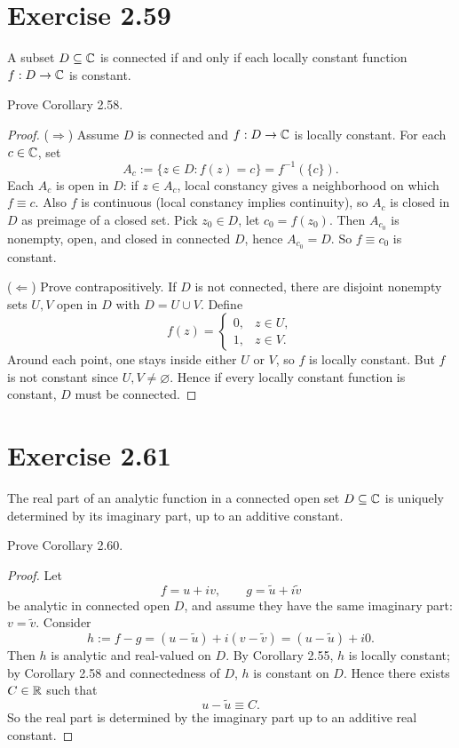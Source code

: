 \documentclass{article}
\begin{document}
\section{Exercise 2.59}

\begin{corollary}[Corollary 2.58]
  A subset $D \subseteq \mathbb{C}$ is connected if and only if each locally
  constant function $f : D \to \mathbb{C}$ is constant.
\end{corollary}

Prove Corollary 2.58.

\begin{proof}
  ($\Rightarrow$) Assume $D$ is connected and $f:D\to\mathbb{C}$ is locally
  constant. For each $c\in\mathbb{C}$, set
  \[
    A_c:=\{z\in D: f(z)=c\}=f^{-1}(\{c\}).
  \]
  Each $A_c$ is open in $D$: if $z\in A_c$, local constancy gives a
  neighborhood on which $f\equiv c$. Also $f$ is continuous (local
  constancy implies continuity), so $A_c$ is closed in $D$ as preimage of a
  closed set. Pick $z_0\in D$, let $c_0=f(z_0)$. Then $A_{c_0}$ is nonempty,
  open, and closed in connected $D$, hence $A_{c_0}=D$. So $f\equiv c_0$ is
  constant.

  ($\Leftarrow$) Prove contrapositively. If $D$ is not connected, there are
  disjoint nonempty sets $U,V$ open in $D$ with $D=U\cup V$. Define
  \[
    f(z)=
    \begin{cases}
      0,& z\in U,\\
      1,& z\in V.
    \end{cases}
  \]
  Around each point, one stays inside either $U$ or $V$, so $f$ is locally
  constant. But $f$ is not constant since $U,V\neq\varnothing$.
  Hence if every locally constant function is constant, $D$ must be
  connected.
\end{proof}

\section{Exercise 2.61}

\begin{corollary}[Corollary 2.60]
  The real part of an analytic function in a connected open set
  $D \subseteq \mathbb{C}$ is uniquely determined by its imaginary part,
  up to an additive constant.
\end{corollary}

Prove Corollary 2.60.

\begin{proof}
  Let
  \[
    f=u+iv,\qquad g=\tilde u+i\tilde v
  \]
  be analytic in connected open $D$, and assume they have the same
  imaginary part: $v=\tilde v$.
  Consider
  \[
    h:=f-g=(u-\tilde u)+i(v-\tilde v)= (u-\tilde u)+i0.
  \]
  Then $h$ is analytic and real-valued on $D$. By Corollary 2.55, $h$ is
  locally constant; by Corollary 2.58 and connectedness of $D$, $h$ is
  constant on $D$. Hence there exists $C\in\mathbb{R}$ such that
  \[
    u-\tilde u\equiv C.
  \]
  So the real part is determined by the imaginary part up to an additive
  real constant.
\end{proof}
\end{document}
